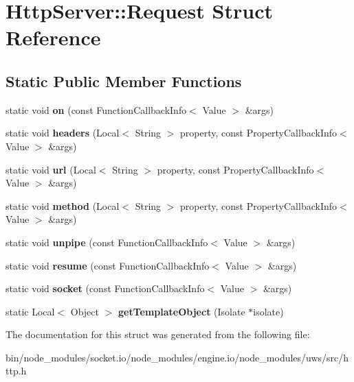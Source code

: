 \hypertarget{struct_http_server_1_1_request}{}\section{Http\+Server\+:\+:Request Struct Reference}
\label{struct_http_server_1_1_request}
\subsection*{Static Public Member Functions}
\begin{DoxyCompactItemize}
\item 
\mbox{\label{struct_http_server_1_1_request_aa83a65fe430fa271f279fe634746ec9d}} 
static void {\bfseries on} (const Function\+Callback\+Info$<$ Value $>$ \&args)
\item 
\mbox{\label{struct_http_server_1_1_request_a75636bf157488f025c21726b34d98511}} 
static void {\bfseries headers} (Local$<$ String $>$ property, const Property\+Callback\+Info$<$ Value $>$ \&args)
\item 
\mbox{\label{struct_http_server_1_1_request_a7d0af2bab6a417a3b49ae08568d66d7f}} 
static void {\bfseries url} (Local$<$ String $>$ property, const Property\+Callback\+Info$<$ Value $>$ \&args)
\item 
\mbox{\label{struct_http_server_1_1_request_a624c80803b4593ad15aae2a15d7d634c}} 
static void {\bfseries method} (Local$<$ String $>$ property, const Property\+Callback\+Info$<$ Value $>$ \&args)
\item 
\mbox{\label{struct_http_server_1_1_request_a3ccae7bd5314a548cf52c81a8b3f465e}} 
static void {\bfseries unpipe} (const Function\+Callback\+Info$<$ Value $>$ \&args)
\item 
\mbox{\label{struct_http_server_1_1_request_a2bd460265480feea2ec01e7fabefd646}} 
static void {\bfseries resume} (const Function\+Callback\+Info$<$ Value $>$ \&args)
\item 
\mbox{\label{struct_http_server_1_1_request_a10708fb0f25039b07685297ec652d88b}} 
static void {\bfseries socket} (const Function\+Callback\+Info$<$ Value $>$ \&args)
\item 
\mbox{\label{struct_http_server_1_1_request_a8f2069e4a7a02ee9d2bbd67467d48992}} 
static Local$<$ Object $>$ {\bfseries get\+Template\+Object} (Isolate $\ast$isolate)
\end{DoxyCompactItemize}


The documentation for this struct was generated from the following file\+:\begin{DoxyCompactItemize}
\item 
bin/node\+\_\+modules/socket.\+io/node\+\_\+modules/engine.\+io/node\+\_\+modules/uws/src/http.\+h\end{DoxyCompactItemize}
